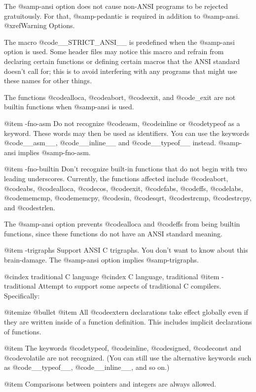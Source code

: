 The @samp{-ansi} option does not cause non-ANSI programs to be
rejected gratuitously.  For that, @samp{-pedantic} is required in
addition to @samp{-ansi}.  @xref{Warning Options}.

The macro @code{__STRICT_ANSI__} is predefined when the @samp{-ansi}
option is used.  Some header files may notice this macro and refrain
from declaring certain functions or defining certain macros that the
ANSI standard doesn't call for; this is to avoid interfering with any
programs that might use these names for other things.

The functions @code{alloca}, @code{abort}, @code{exit}, and
@code{_exit} are not builtin functions when @samp{-ansi} is used.

@item -fno-asm
Do not recognize @code{asm}, @code{inline} or @code{typeof} as a
keyword.  These words may then be used as identifiers.  You can use the
keywords @code{__asm__}, @code{__inline__} and @code{__typeof__}
instead.  @samp{-ansi} implies @samp{-fno-asm}.

@item -fno-builtin
Don't recognize built-in functions that do not begin with two leading
underscores.  Currently, the functions affected include @code{abort},
@code{abs}, @code{alloca}, @code{cos}, @code{exit}, @code{fabs},
@code{ffs}, @code{labs}, @code{memcmp}, @code{memcpy}, @code{sin},
@code{sqrt}, @code{strcmp}, @code{strcpy}, and @code{strlen}.

The @samp{-ansi} option prevents @code{alloca} and @code{ffs} from being
builtin functions, since these functions do not have an ANSI standard
meaning.

@item -trigraphs
Support ANSI C trigraphs.  You don't want to know about this
brain-damage.  The @samp{-ansi} option implies @samp{-trigraphs}.

@cindex traditional C language
@cindex C language, traditional
@item -traditional
Attempt to support some aspects of traditional C compilers.
Specifically:

@itemize @bullet
@item
All @code{extern} declarations take effect globally even if they
are written inside of a function definition.  This includes implicit
declarations of functions.

@item
The keywords @code{typeof}, @code{inline}, @code{signed}, @code{const}
and @code{volatile} are not recognized.  (You can still use the
alternative keywords such as @code{__typeof__}, @code{__inline__}, and
so on.)

@item
Comparisons between pointers and integers are always allowed.


